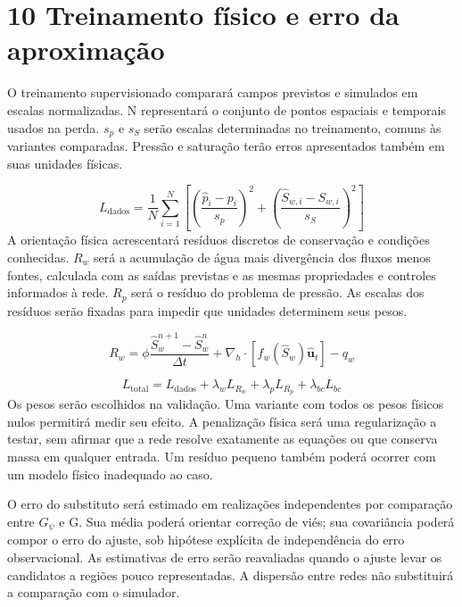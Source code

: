\documentclass[12pt,a4paper]{article}
\begin{document}
\newpage
\section*{10 Treinamento físico e erro da aproximação}
O treinamento supervisionado comparará campos previstos e simulados em escalas normalizadas. N representará o conjunto de pontos espaciais e temporais usados na perda. \(s_{p}\) e \(s_{S}\) serão escalas determinadas no treinamento, comuns às variantes comparadas. Pressão e saturação terão erros apresentados também em suas unidades físicas.\par

\begin{equation}
L_{\mathrm{dados}}=\frac1N\sum_{i=1}^N\left[\left(\frac{\widehat p_i-p_i}{s_p}\right)^2+\left(\frac{\widehat S_{w,i}-S_{w,i}}{s_S}\right)^2\right]
\end{equation}
A orientação física acrescentará resíduos discretos de conservação e condições conhecidas. \(R_{w}\) será a acumulação de água mais divergência dos fluxos menos fontes, calculada com as saídas previstas e as mesmas propriedades e controles informados à rede. \(R_{p}\) será o resíduo do problema de pressão. As escalas dos resíduos serão fixadas para impedir que unidades determinem seus pesos.\par

\begin{equation}
R_w=\phi\frac{\widehat S_w^{n+1}-\widehat S_w^n}{\Delta t}+\nabla_h\cdot\left[f_w(\widehat S_w)\widehat{\mathbf u}_t\right]-q_w
\end{equation}

\begin{equation}
L_{\mathrm{total}}=L_{\mathrm{dados}}+\lambda_wL_{R_w}+\lambda_pL_{R_p}+\lambda_{bc}L_{bc}
\end{equation}
Os pesos serão escolhidos na validação. Uma variante com todos os pesos físicos nulos permitirá medir seu efeito. A penalização física será uma regularização a testar, sem afirmar que a rede resolve exatamente as equações ou que conserva massa em qualquer entrada. Um resíduo pequeno também poderá ocorrer com um modelo físico inadequado ao caso.\par
O erro do substituto será estimado em realizações independentes por comparação entre \(G_{\psi}\) e G. Sua média poderá orientar correção de viés; sua covariância poderá compor o erro do ajuste, sob hipótese explícita de independência do erro observacional. As estimativas de erro serão reavaliadas quando o ajuste levar os candidatos a regiões pouco representadas. A dispersão entre redes não substituirá a comparação com o simulador.\par
\end{document}
